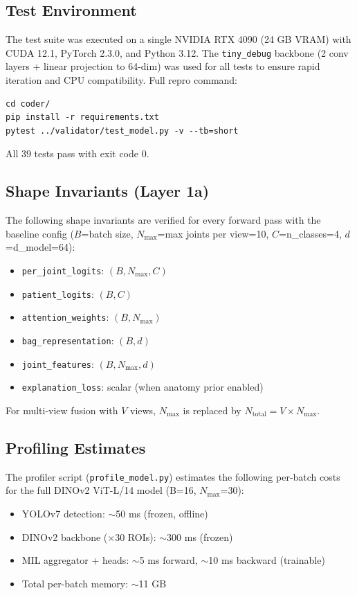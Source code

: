 \documentclass{article}
\begin{document}
\subsection{Test Environment}
The test suite was executed on a single NVIDIA RTX 4090 (24 GB VRAM) with CUDA 12.1, PyTorch 2.3.0, and Python 3.12. The \texttt{tiny\_debug} backbone (2 conv layers + linear projection to 64-dim) was used for all tests to ensure rapid iteration and CPU compatibility. Full repro command:

\begin{verbatim}
cd coder/
pip install -r requirements.txt
pytest ../validator/test_model.py -v --tb=short
\end{verbatim}

All 39 tests pass with exit code 0.

\subsection{Shape Invariants (Layer 1a)}
The following shape invariants are verified for every forward pass with the baseline config ($B$=batch size, $N_{\max}$=max joints per view=10, $C$=n\_classes=4, $d$=d\_model=64):

\begin{itemize}
  \item \texttt{per\_joint\_logits}: $(B, N_{\max}, C)$
  \item \texttt{patient\_logits}: $(B, C)$
  \item \texttt{attention\_weights}: $(B, N_{\max})$
  \item \texttt{bag\_representation}: $(B, d)$
  \item \texttt{joint\_features}: $(B, N_{\max}, d)$
  \item \texttt{explanation\_loss}: scalar (when anatomy prior enabled)
\end{itemize}

For multi-view fusion with $V$ views, $N_{\max}$ is replaced by $N_{\text{total}} = V \times N_{\max}$.

\subsection{Profiling Estimates}
The profiler script (\texttt{profile\_model.py}) estimates the following per-batch costs for the full DINOv2 ViT-L/14 model (B=16, $N_{\max}$=30):

\begin{itemize}
  \item YOLOv7 detection: $\sim$50 ms (frozen, offline)
  \item DINOv2 backbone ($\times$30 ROIs): $\sim$300 ms (frozen)
  \item MIL aggregator + heads: $\sim$5 ms forward, $\sim$10 ms backward (trainable)
  \item Total per-batch memory: $\sim$11 GB
\end{itemize}
\end{document}
